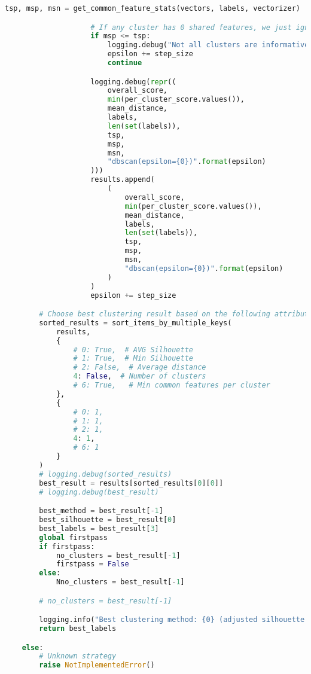 \begin{lstlisting}[language=python]
                    tsp, msp, msn = get_common_feature_stats(vectors, labels, vectorizer)

                    # If any cluster has 0 shared features, we just ignore the result
                    if msp <= tsp:
                        logging.debug("Not all clusters are informative (a cluster has 0 shared features) ")
                        epsilon += step_size
                        continue

                    logging.debug(repr((
                        overall_score,
                        min(per_cluster_score.values()),
                        mean_distance,
                        labels,
                        len(set(labels)),
                        tsp,
                        msp,
                        msn,
                        "dbscan(epsilon={0})".format(epsilon)
                    )))
                    results.append(
                        (
                            overall_score,
                            min(per_cluster_score.values()),
                            mean_distance,
                            labels,
                            len(set(labels)),
                            tsp,
                            msp,
                            msn,
                            "dbscan(epsilon={0})".format(epsilon)
                        )
                    )
                    epsilon += step_size

        # Choose best clustering result based on the following attributes
        sorted_results = sort_items_by_multiple_keys(
            results,
            {
                # 0: True,  # AVG Silhouette
                # 1: True,  # Min Silhouette
                # 2: False,  # Average distance
                4: False,  # Number of clusters
                # 6: True,   # Min common features per cluster
            },
            {
                # 0: 1,
                # 1: 1,
                # 2: 1,
                4: 1,
                # 6: 1
            }
        )
        # logging.debug(sorted_results)
        best_result = results[sorted_results[0][0]]
        # logging.debug(best_result)

        best_method = best_result[-1]
        best_silhouette = best_result[0]
        best_labels = best_result[3]
        global firstpass
        if firstpass:
            no_clusters = best_result[-1]
            firstpass = False
        else:
            Nno_clusters = best_result[-1]

        # no_clusters = best_result[-1]

        logging.info("Best clustering method: {0} (adjusted silhouette == {1})".format(best_method, best_silhouette))
        return best_labels

    else:
        # Unknown strategy
        raise NotImplementedError()
\end{lstlisting}

